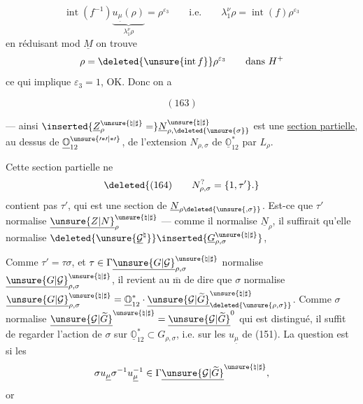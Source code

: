 \[
\operatorname{int}(f^{-1})\underbrace{u_{\underline\mu}(\rho)}_{\lambda_1^\nu\rho}
=\rho^{\varepsilon_3}\qquad\text{i.e.}\qquad
\lambda_1^\nu\rho=\operatorname{int}(f)\rho^{\varepsilon_3}
\]
en réduisant mod $\underline M$ on trouve
\[
\rho=\deleted{\unsure{\operatorname{int}f}}\rho^{\varepsilon_3}\qquad\text{dans }H^+
\]
ce qui implique $\varepsilon_3=1$, OK. Donc on a
\begin{samepage}
\[
(163)
\]
\end{samepage}
--- ainsi $\inserted{\underline Z_\rho^{\unsure{\natural|\sharp}}=}\underline N_{\rho,\deleted{\unsure{\sigma}}}^{\unsure{\natural|\sharp}}$ est une \uline{section partielle}, au dessus de $\underline{\mathbb O}_{12}^{\unsure{\prime*\prime|*\prime}}$, de l'extension $N_{\rho,\sigma}$ de $\underline{\mathbb O}_{12}^{*}$ par $L_\rho$.

 Cette section partielle ne
\[
\deleted{(164)\qquad N_{\rho,\sigma}^{?}=\{1,\tau'\}.}
\]
contient pas $\tau'$, qui est une section de $\underline N_{\rho\deleted{\unsure{,\sigma}}}$. Est-ce que $\tau'$ normalise $\underline{\unsure{Z|N}}_\rho^{\unsure{\natural|\sharp}}$ --- comme il normalise $\underline N_\rho$, il suffirait qu'elle normalise
$\deleted{\unsure{\underline{\mathcal G}^{\natural}}}\inserted{\underline G_{\rho,\sigma}^{\unsure{\natural|\sharp}}}$,

Comme $\tau'=\tau\sigma$,  et
$\tau\in\Gamma\underline{\unsure{G|\mathcal G}}_{\rho,\sigma}^{\unsure{\natural|\sharp}}$
normalise $\underline{\unsure{G|\mathcal G}}_{\rho,\sigma}^{\unsure{\natural|\sharp}}$,
il revient au $\overline{\mathrm m}$ de dire que $\sigma$ normalise
$\underline{\unsure{G|\mathcal G}}_{\rho,\sigma}^{\unsure{\natural|\sharp}}
=\underline{\mathbb O}_{12}^{*}\cdot\underline{\unsure{\mathcal G|\widetilde G}}^{\unsure{\natural|\sharp}}_{\deleted{\unsure{\rho,\sigma}}}$.
Comme $\sigma$ normalise $\underline{\unsure{\mathcal G|\widetilde G}}^{\unsure{\natural|\sharp}}=\underline{\unsure{\mathcal G|\widetilde G}}^0$ qui est distingué, il suffit de regarder l'action de $\sigma$ sur $\underline{\mathbb O}_{12}^{*}\subset G_{\rho,\sigma}$,  i.e. sur les $u_{\underline\mu}$ de (151). La question est si les
\[
\sigma u_{\underline\mu}\sigma^{-1}u_{\underline\mu}^{-1}\in\Gamma\underline{\unsure{\mathcal G|\widetilde G}}^{\unsure{\natural|\sharp}},
\]
or

